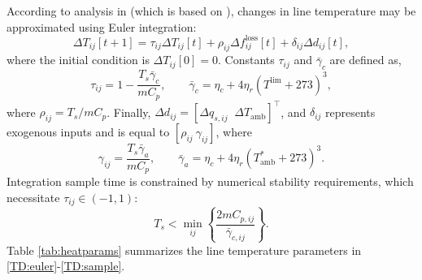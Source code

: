 \documentclass[conference]{IEEEtran}
\begin{document}
According to analysis in \cite{almassalkhi2014} (which is based on
\cite{ieee2007}), changes in line temperature may be approximated
using Euler integration:
\begin{equation}
\label{TD:euler}
\Delta T_{ij}[t+1] = \tau_{ij}\Delta T_{ij}[t] + \rho_{ij}\Delta
f_{ij}^\text{loss}[t] + \delta_{ij}\Delta d_{ij}[t],
\end{equation}
where the initial condition is $\Delta T_{ij}[0] = 0$. Constants
$\tau_{ij}$ and $\bar{\gamma}_c$ are defined as,
\begin{equation}
\tau_{ij} = 1 - \frac{T_s\bar{\gamma}_c}{mC_p},\qquad \bar{\gamma}_c =
\eta_c + 4\eta_r(T^\text{lim} + 273)^3,
\end{equation}
where $\rho_{ij} = T_s/mC_p$. Finally, $\Delta d_{ij} = [\Delta
  q_{s,ij} \;\; \Delta T_\text{amb}]^\top$, and $\delta_{ij}$ represents
exogenous inputs and is equal to $[\rho_{ij}~\gamma_{ij}]$, where
\begin{equation}
\gamma_{ij} = \frac{T_s\bar{\gamma}_a}{mC_p}, \qquad \bar{\gamma}_a =
\eta_c + 4\eta_r(T_\text{amb}^* + 273)^3.
\end{equation}
Integration sample time is constrained by numerical stability
requirements, which necessitate $\tau_{ij}\in(-1,1)$:
\begin{equation}
\label{TD:sample}
T_s < \min_{ij}\left\lbrace \frac{2mC_{p,ij}}{\bar{\gamma}_{c,ij}}\right\rbrace.
\end{equation}
Table \ref{tab:heatparams} summarizes the line temperature parameters
in \eqref{TD:euler}-\eqref{TD:sample}.
\end{document}
